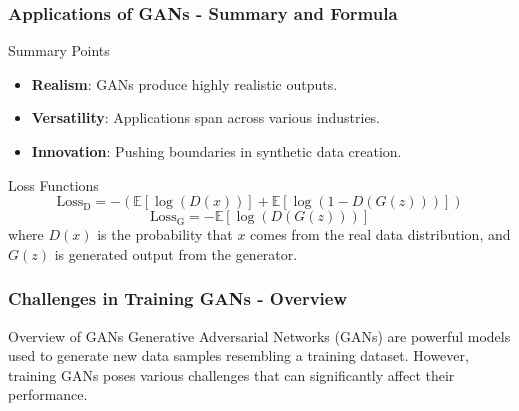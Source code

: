 \documentclass[aspectratio=169]{beamer}
\begin{document}
\begin{frame}[fragile]
    \frametitle{Applications of GANs - Summary and Formula}
    \begin{block}{Summary Points}
        \begin{itemize}
            \item \textbf{Realism}: GANs produce highly realistic outputs.
            \item \textbf{Versatility}: Applications span across various industries.
            \item \textbf{Innovation}: Pushing boundaries in synthetic data creation.
        \end{itemize}
    \end{block}

    \begin{block}{Loss Functions}
        \begin{equation}
        \text{Loss}_{\text{D}} = -\left( \mathbb{E}[\log(D(x))] + \mathbb{E}[\log(1 - D(G(z)))] \right)
        \end{equation}
        \begin{equation}
        \text{Loss}_{\text{G}} = -\mathbb{E}[\log(D(G(z)))]
        \end{equation}
        where \(D(x)\) is the probability that \(x\) comes from the real data distribution, and \(G(z)\) is generated output from the generator.
    \end{block}
\end{frame}

\begin{frame}[fragile]
    \frametitle{Challenges in Training GANs - Overview}
    \begin{block}{Overview of GANs}
        Generative Adversarial Networks (GANs) are powerful models used to generate new data samples resembling a training dataset. However, training GANs poses various challenges that can significantly affect their performance.
    \end{block}
\end{frame}
\end{document}
